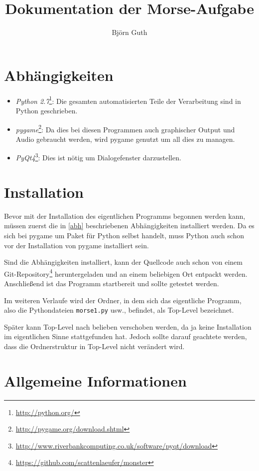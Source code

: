 \documentclass[a4paper]{scrartcl}
\author{Bj\"orn Guth}
\title{Dokumentation der Morse-Aufgabe}
\newtheorem[M]{thmL}{Definition}
\begin{document}
\maketitle

\section{Abhängigkeiten}
\label{abh}
\begin{itemize}
	\item \emph{Python 2.7}\footnote{\url{http://python.org/}}: Die gesamten automatisierten Teile der Verarbeitung sind in Python geschrieben.
	\item \emph{pygame}\footnote{\url{http://pygame.org/download.shtml}}: Da dies bei diesen Programmen auch graphischer Output und Audio gebraucht werden, wird pygame genutzt um all dies zu managen.
	\item \emph{PyQt4}\footnote{\url{http://www.riverbankcomputing.co.uk/software/pyqt/download}}: Dies ist nötig um Dialogefenster darzustellen.
\end{itemize}

\section{Installation}
Bevor mit der Installation des eigentlichen Programms begonnen werden kann, müssen zuerst die in \autoref{abh} beschriebenen Abhängigkeiten installiert werden. Da es sich bei pygame um Paket für Python selbst handelt, muss Python auch schon vor der Installation von pygame installiert sein.

Sind die Abhängigkeiten installiert, kann der Quellcode auch schon von einem Git-Repository\footnote{\url{https://github.com/scattenlaeufer/monster}} heruntergeladen und an einem beliebigen Ort entpackt werden. Anschließend ist das Programm startbereit und sollte getestet werden.
\begin{thmL}
	Im weiteren Verlaufe wird der Ordner, in dem sich das eigentliche Programm, also die Pythondateien \verb+morse1.py+ usw., befindet, als Top-Level bezeichnet.
\end{thmL}
Später kann Top-Level nach belieben verschoben werden, da ja keine Installation im eigentlichen Sinne stattgefunden hat. Jedoch sollte darauf geachtete werden, dass die Ordnerstruktur in Top-Level nicht verändert wird.

\section{Allgemeine Informationen}
\end{document}
